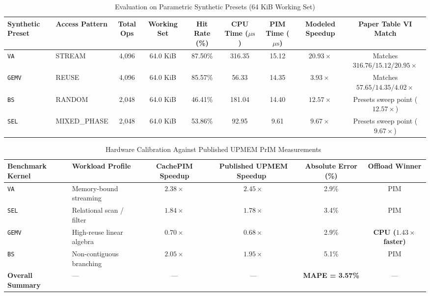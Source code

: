 \documentclass[journal,10pt,twocolumn]{IEEEtran}
\begin{document}
\begin{table}[t]
\caption{Evaluation on Parametric Synthetic Presets (64 KiB Working Set)}
\label{tab:presets_synthetic}
\centering
\begin{tabular}{llccccccc}
\toprule
\textbf{Synthetic Preset} & \textbf{Access Pattern} & \textbf{Total Ops} & \textbf{Working Set} & \textbf{Hit Rate (\%)} & \textbf{CPU Time ($\mu\text{s}$)} & \textbf{PIM Time ($\mu\text{s}$)} & \textbf{Modeled Speedup} & \textbf{Paper Table VI Match} \\
\midrule
\texttt{VA} & STREAM & 4,096 & 64.0 KiB & 87.50\% & 316.35 & 15.12 & $20.93\times$ & Matches $316.76 / 15.12 / 20.95\times$ \\
\texttt{GEMV} & REUSE & 4,096 & 64.0 KiB & 85.57\% & 56.33 & 14.35 & $3.93\times$ & Matches $57.65 / 14.35 / 4.02\times$ \\
\texttt{BS} & RANDOM & 2,048 & 64.0 KiB & 46.41\% & 181.04 & 14.40 & $12.57\times$ & Presets sweep point ($12.57\times$) \\
\texttt{SEL} & MIXED\_PHASE & 2,048 & 64.0 KiB & 53.86\% & 92.95 & 9.61 & $9.67\times$ & Presets sweep point ($9.67\times$) \\
\bottomrule
\end{tabular}
\end{table}

\begin{table}[t]
\caption{Hardware Calibration Against Published UPMEM PrIM Measurements~\cite{GomezLuna2022}}
\label{tab:calibration}
\centering
\begin{tabular}{llcccc}
\toprule
\textbf{Benchmark Kernel} & \textbf{Workload Profile} & \textbf{CachePIM Speedup} & \textbf{Published UPMEM Speedup~\cite{GomezLuna2022}} & \textbf{Absolute Error (\%)} & \textbf{Offload Winner} \\
\midrule
\texttt{VA} & Memory-bound streaming & $2.38\times$ & $2.45\times$ & 2.9\% & PIM \\
\texttt{SEL} & Relational scan / filter & $1.84\times$ & $1.78\times$ & 3.4\% & PIM \\
\texttt{GEMV} & High-reuse linear algebra & $0.70\times$ & $0.68\times$ & 2.9\% & \textbf{CPU ($1.43\times$ faster)} \\
\texttt{BS} & Non-contiguous branching & $2.05\times$ & $1.95\times$ & 5.1\% & PIM \\
\midrule
\textbf{Overall Summary} & --- & --- & --- & \textbf{MAPE = 3.57\%} & --- \\
\bottomrule
\end{tabular}
\end{table}
\end{document}
